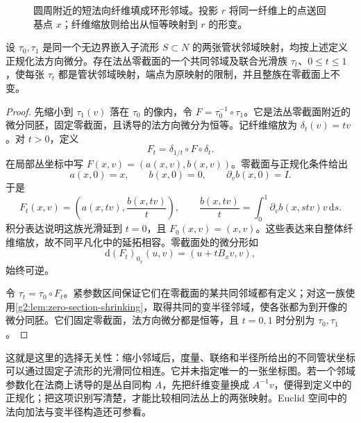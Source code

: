 \begin{figure}[htbp]
	\centering
	
	\caption[法向纤维与管状邻域收缩]{圆周附近的短法向纤维填成环形邻域。投影 \(r\) 将同一纤维上的点送回基点 \(x\)；纤维缩放则给出从恒等映射到 \(r\) 的形变。}
	\label{g2:fig:tubular-retraction}
\end{figure}


\begin{proposition}\label{g2:prop:tubular-uniqueness}
	设 \(\tau_0,\tau_1\) 是同一个无边界嵌入子流形 \(S\subset N\) 的两张管状邻域映射，均按上述定义正规化法方向微分。存在法丛零截面的一个共同邻域及联合光滑族 \(\tau_t\)、\(0\le t\le1\)，使每张 \(\tau_t\) 都是管状邻域映射，端点为原映射的限制，并且整族在零截面上不变。
\end{proposition}
\begin{proof}
	先缩小到 \(\tau_1(v)\) 落在 \(\tau_0\) 的像内，令 \(F=\tau_0^{-1}\circ\tau_1\)。它是法丛零截面附近的微分同胚，固定零截面，且诱导的法方向微分为恒等。记纤维缩放为 \(\delta_t(v)=tv\)。对 \(t>0\)，定义
	\[
		F_t=\delta_{1/t}\circ F\circ\delta_t.
	\]
	在局部丛坐标中写 \(F(x,v)=(a(x,v),b(x,v))\)。零截面与正规化条件给出
	\[
		a(x,0)=x,\qquad b(x,0)=0,\qquad \partial_vb(x,0)=I.
	\]
	于是
	\[
		F_t(x,v)=\left(a(x,tv),\frac{b(x,tv)}t\right),\qquad
		\frac{b(x,tv)}t=\int_0^1\partial_vb(x,stv)v\,\mathrm{d}s.
	\]
	积分表达说明这族光滑延到 \(t=0\)，且 \(F_0(x,v)=(x,v)\)。这些表达来自整体纤维缩放，故不同平凡化中的延拓相容。零截面处的微分形如
	\[
		\mathrm{d}(F_t)_{0_x}(u,v)=(u+tB_xv,v),
	\]
	始终可逆。

	令 \(\tau_t=\tau_0\circ F_t\)。紧参数区间保证它们在零截面的某共同邻域都有定义；对这一族使用\cref{g2:lem:zero-section-shrinking}，取得共同的变半径邻域，使各张都为到开像的微分同胚。它们固定零截面，法方向微分都是恒等，且 \(t=0,1\) 时分别为 \(\tau_0,\tau_1\)。
\end{proof}

这就是这里的选择无关性：缩小邻域后，度量、联络和半径所给出的不同管状坐标可以通过固定子流形的光滑同位相连。它并未指定唯一的一张坐标图。若一个邻域参数化在法商上诱导的是丛自同构 \(A\)，先把纤维变量换成 \(A^{-1}v\)，便得到定义中的正规化；把这项识别写清楚，才能比较相同法丛上的两张映射。Euclid 空间中的法向加法与变半径构造还可参看\cite[第138--141页，定理6.24及命题6.25]{Lee2012Smooth}。
